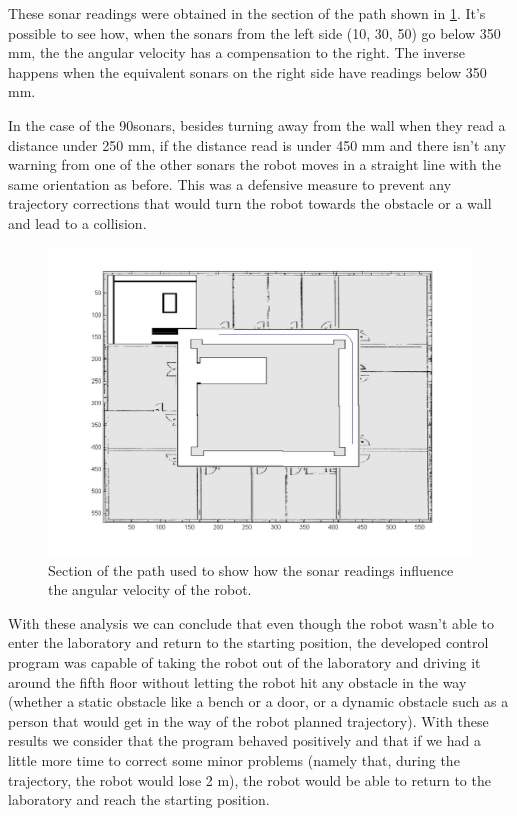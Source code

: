 \documentclass[11pt,a4paper]{scrartcl}
\begin{document}
These sonar readings were obtained in the section of the path shown in \ref{fig:sonar_map_section}. It's possible to see how, when the sonars from the left side (10\degree, 30\degree, 50\degree) go below 350 mm, the the angular velocity has a compensation to the right. The inverse happens when the equivalent sonars on the right side have readings below 350 mm.

In the case of the 90\degree sonars, besides turning away from the wall when they read a distance under 250 mm, if the distance read is under 450 mm and there isn't any warning from one of the other sonars the robot moves in a straight line with the same orientation as before. This was a defensive measure to prevent any trajectory corrections that would turn the robot towards the obstacle or a wall and lead to a collision.

\begin{figure}[H]
	\centering
	\includegraphics[width=0.7\linewidth]{sonar_map_used_section.jpg}
	\caption{Section of the path used to show how the sonar readings influence the angular velocity of the robot.}
    \label{fig:sonar_map_section}
\end{figure}

With these analysis we can conclude that even though the robot wasn't able to enter the laboratory and return to the starting position, the developed control program was capable of taking the robot out of the laboratory and driving it around the fifth floor without letting the robot hit any obstacle in the way (whether a static obstacle like a bench or a door, or a dynamic obstacle such as a person that would get in the way of the robot planned trajectory). With these results we consider that the program behaved positively and that if we had a little more time to correct some minor problems (namely that, during the trajectory, the robot would lose 2 m), the robot would be able to return to the laboratory and reach the starting position.
\end{document}
